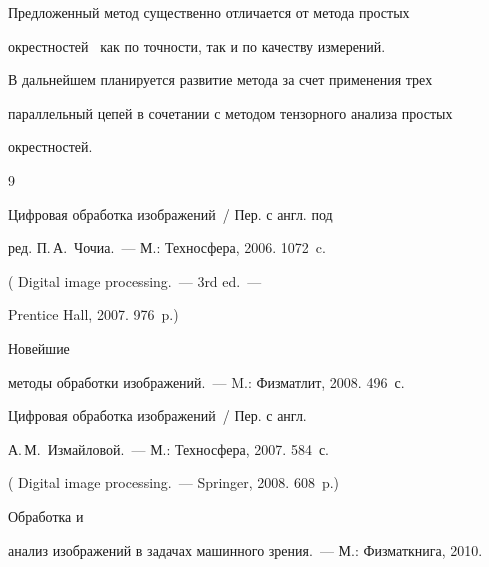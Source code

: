   


  Предложенный метод существенно отличается от метода простых 


окрестностей~\cite{4-gk} как по точности, так и по качеству измерений.


  


  В дальнейшем планируется развитие метода за счет применения трех 


параллельный цепей в сочетании с методом тензорного анализа простых 


окрестностей.


  


{\small\frenchspacing


{%




\begin{thebibliography}{9}




 Цифровая обработка изображений~/ Пер. с англ. под 


ред. П.\,А.~Чочиа.~--- М.: Техносфера, 2006. 1072~c.


( Digital image processing.~--- 3rd ed.~---


Prentice Hall, 2007. 976~p.)




 Новейшие 


методы обработки изображений.~--- M.: Физматлит, 2008. 496~с.







 Цифровая обработка изображений~/ Пер. с англ. 


А.\,М.~Измайловой.~--- М.: Техносфера, 2007. 584~с.


( Digital image processing.~--- Springer, 2008. 608~p.)







 Обработка и 


анализ изображений в задачах машинного зрения.~--- М.: Физматкнига, 2010. 



\end{thebibliography}}}
